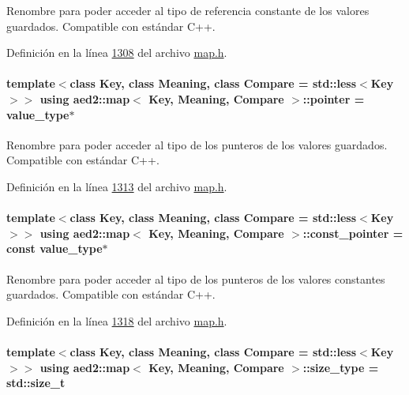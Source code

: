 Renombre para poder acceder al tipo de referencia constante de los valores guardados. Compatible con estándar C++. 



Definición en la línea \hyperlink{map_8h_source_l01308}{1308} del archivo \hyperlink{map_8h_source}{map.\-h}.

\hypertarget{classaed2_1_1map_a7394e98a23b86bc008ad73326b273fd5_a7394e98a23b86bc008ad73326b273fd5}{
\paragraph[{pointer}]{\setlength{\rightskip}{0pt plus 5cm}template$<$class Key, class Meaning, class Compare = std\-::less$<$\-Key$>$$>$ using {\bf aed2\-::map}$<$ Key, Meaning, Compare $>$\-::{\bf pointer} =  {\bf value\-\_\-type}$\ast$}}\label{classaed2_1_1map_a7394e98a23b86bc008ad73326b273fd5_a7394e98a23b86bc008ad73326b273fd5}


Renombre para poder acceder al tipo de los punteros de los valores guardados. Compatible con estándar C++. 



Definición en la línea \hyperlink{map_8h_source_l01313}{1313} del archivo \hyperlink{map_8h_source}{map.\-h}.

\hypertarget{classaed2_1_1map_a1366fc3e227a49777cb748fc6d4e022b_a1366fc3e227a49777cb748fc6d4e022b}{
\paragraph[{const\-\_\-pointer}]{\setlength{\rightskip}{0pt plus 5cm}template$<$class Key, class Meaning, class Compare = std\-::less$<$\-Key$>$$>$ using {\bf aed2\-::map}$<$ Key, Meaning, Compare $>$\-::{\bf const\-\_\-pointer} =  const {\bf value\-\_\-type}$\ast$}}\label{classaed2_1_1map_a1366fc3e227a49777cb748fc6d4e022b_a1366fc3e227a49777cb748fc6d4e022b}


Renombre para poder acceder al tipo de los punteros de los valores constantes guardados. Compatible con estándar C++. 



Definición en la línea \hyperlink{map_8h_source_l01318}{1318} del archivo \hyperlink{map_8h_source}{map.\-h}.

\hypertarget{classaed2_1_1map_a8cf1c570f605e9c0ad6feb8ce12c9400_a8cf1c570f605e9c0ad6feb8ce12c9400}{
\paragraph[{size\-\_\-type}]{\setlength{\rightskip}{0pt plus 5cm}template$<$class Key, class Meaning, class Compare = std\-::less$<$\-Key$>$$>$ using {\bf aed2\-::map}$<$ Key, Meaning, Compare $>$\-::{\bf size\-\_\-type} =  std\-::size\-\_\-t}}\label{classaed2_1_1map_a8cf1c570f605e9c0ad6feb8ce12c9400_a8cf1c570f605e9c0ad6feb8ce12c9400}



